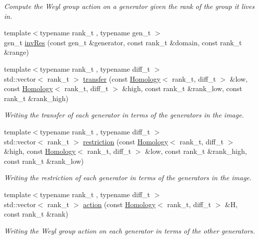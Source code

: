 \begin{DoxyCompactItemize}
\begin{DoxyCompactList}\small\item\em Compute the Weyl group action on a generator given the rank of the group it lives in. \end{DoxyCompactList}\item 
{\footnotesize template$<$typename rank\+\_\+t , typename gen\+\_\+t $>$ }\\gen\+\_\+t \hyperlink{namespaceMackey_a30b5667e411ff694aa989e95e394bb41}{inv\+Res} (const gen\+\_\+t \&generator, const rank\+\_\+t \&domain, const rank\+\_\+t \&range)
\item 
{\footnotesize template$<$typename rank\+\_\+t , typename diff\+\_\+t $>$ }\\std\+::vector$<$ rank\+\_\+t $>$ \hyperlink{namespaceMackey_a5b14999d16c90eb1fdaa40d31809f662}{transfer} (const \hyperlink{classMackey_1_1Homology}{Homology}$<$ rank\+\_\+t, diff\+\_\+t $>$ \&low, const \hyperlink{classMackey_1_1Homology}{Homology}$<$ rank\+\_\+t, diff\+\_\+t $>$ \&high, const rank\+\_\+t \&rank\+\_\+low, const rank\+\_\+t \&rank\+\_\+high)
\begin{DoxyCompactList}\small\item\em Writing the transfer of each generator in terms of the generators in the image. \end{DoxyCompactList}\item 
{\footnotesize template$<$typename rank\+\_\+t , typename diff\+\_\+t $>$ }\\std\+::vector$<$ rank\+\_\+t $>$ \hyperlink{namespaceMackey_a7b62b0d041087605dabd4ab3753f1186}{restriction} (const \hyperlink{classMackey_1_1Homology}{Homology}$<$ rank\+\_\+t, diff\+\_\+t $>$ \&high, const \hyperlink{classMackey_1_1Homology}{Homology}$<$ rank\+\_\+t, diff\+\_\+t $>$ \&low, const rank\+\_\+t \&rank\+\_\+high, const rank\+\_\+t \&rank\+\_\+low)
\begin{DoxyCompactList}\small\item\em Writing the restriction of each generator in terms of the generators in the image. \end{DoxyCompactList}\item 
{\footnotesize template$<$typename rank\+\_\+t , typename diff\+\_\+t $>$ }\\std\+::vector$<$ rank\+\_\+t $>$ \hyperlink{namespaceMackey_a9a4f2ced77550a7c06d2c15b39030ff6}{action} (const \hyperlink{classMackey_1_1Homology}{Homology}$<$ rank\+\_\+t, diff\+\_\+t $>$ \&H, const rank\+\_\+t \&rank)
\begin{DoxyCompactList}\small\item\em Writing the Weyl group action on each generator in terms of the other generators. \end{DoxyCompactList}\item 

\end{DoxyCompactItemize}
